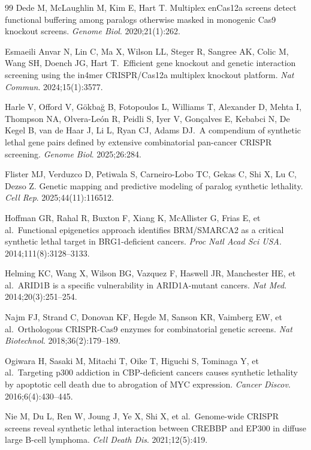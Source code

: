 \documentclass[11pt,a4paper]{article}
\begin{document}
\begin{thebibliography}{99}
 Dede M, McLaughlin M, Kim E, Hart T. Multiplex enCas12a screens detect functional buffering among paralogs otherwise masked in monogenic Cas9 knockout screens. \textit{Genome Biol}. 2020;21(1):262.

 Esmaeili Anvar N, Lin C, Ma X, Wilson LL, Steger R, Sangree AK, Colic M, Wang SH, Doench JG, Hart T.\ Efficient gene knockout and genetic interaction screening using the in4mer CRISPR/Cas12a multiplex knockout platform. \textit{Nat Commun}. 2024;15(1):3577.

 Harle V, Offord V, Gökbağ B, Fotopoulos L, Williams T, Alexander D, Mehta I, Thompson NA, Olvera-León R, Peidli S, Iyer V, Gonçalves E, Kebabci N, De Kegel B, van de Haar J, Li L, Ryan CJ, Adams DJ.\ A compendium of synthetic lethal gene pairs defined by extensive combinatorial pan-cancer CRISPR screening. \textit{Genome Biol}. 2025;26:284.

 Flister MJ, Verduzco D, Petiwala S, Carneiro-Lobo TC, Gekas C, Shi X, Lu C, Dezso Z. Genetic mapping and predictive modeling of paralog synthetic lethality. \textit{Cell Rep}. 2025;44(11):116512.

 Hoffman GR, Rahal R, Buxton F, Xiang K, McAllister G, Frias E, et al.\ Functional epigenetics approach identifies BRM/SMARCA2 as a critical synthetic lethal target in BRG1-deficient cancers. \textit{Proc Natl Acad Sci USA}. 2014;111(8):3128--3133.

 Helming KC, Wang X, Wilson BG, Vazquez F, Haswell JR, Manchester HE, et al.\ ARID1B is a specific vulnerability in ARID1A-mutant cancers. \textit{Nat Med}. 2014;20(3):251--254.

 Najm FJ, Strand C, Donovan KF, Hegde M, Sanson KR, Vaimberg EW, et al.\ Orthologous CRISPR-Cas9 enzymes for combinatorial genetic screens. \textit{Nat Biotechnol}. 2018;36(2):179--189.

 Ogiwara H, Sasaki M, Mitachi T, Oike T, Higuchi S, Tominaga Y, et al.\ Targeting p300 addiction in CBP-deficient cancers causes synthetic lethality by apoptotic cell death due to abrogation of MYC expression. \textit{Cancer Discov}. 2016;6(4):430--445.

 Nie M, Du L, Ren W, Joung J, Ye X, Shi X, et al.\ Genome-wide CRISPR screens reveal synthetic lethal interaction between CREBBP and EP300 in diffuse large B-cell lymphoma. \textit{Cell Death Dis}. 2021;12(5):419.


\end{thebibliography}
\end{document}
